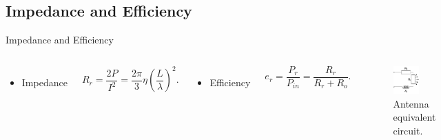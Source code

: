 \subsection{Impedance and Efficiency}

\begin{frame}{Impedance and Efficiency}
    \vspace{-6mm}
    \begin{columns}
        \begin{itemize}
            \item Impedance
        \end{itemize}
        \begin{equation*}
            R_r = \dfrac{2P}{I^2} = \dfrac{2\pi}{3} \eta \left( \dfrac{L}{\lambda} \right)^2.
        \end{equation*}
        \vspace{-3mm}
        \begin{itemize}
            \item Efficiency
        \end{itemize}
        \begin{equation*}
            e_r = \dfrac{P_r}{P_{in}} = \dfrac{R_r}{R_r+R_o}.
        \end{equation*}
        \vspace{-6mm}
        \begin{figure}
            \centering
            \includegraphics[width=0.6\textwidth]{Figures/Antenna_circuit.pdf}
            \caption{Antenna equivalent circuit.}
            \label{fig:Antenna_circuit}
        \end{figure}
        

\end{columns}
\end{frame}
